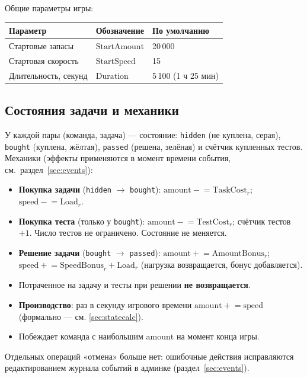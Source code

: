 \documentclass[12pt,a4paper]{article}
\newcommand{\field}[1]{\texttt{#1}}
\begin{document}
Общие параметры игры:

\begin{longtable}{@{}p{5.2cm}p{3.6cm}p{6.4cm}@{}}
\toprule
\textbf{Параметр} & \textbf{Обозначение} & \textbf{По умолчанию} \\
\midrule
Стартовые запасы & $\mathrm{StartAmount}$ & 20\,000 \\
Стартовая скорость & $\mathrm{StartSpeed}$ & 15 \\
Длительность, секунд & $\mathrm{Duration}$ & 5\,100 (1 ч 25 мин) \\
\bottomrule
\end{longtable}

\subsection{Состояния задачи и механики}

У каждой пары (команда, задача) --- состояние: \field{hidden} (не куплена,
серая), \field{bought} (куплена, жёлтая), \field{passed} (решена, зелёная)
и счётчик купленных тестов. Механики (эффекты применяются в момент времени
события, см.~раздел~\ref{sec:events}):

\begin{itemize}[nosep]
  \item \textbf{Покупка задачи} (\field{hidden} $\to$ \field{bought}):
        $\mathrm{amount} \mathrel{-}= \mathrm{TaskCost}_r$;
        $\mathrm{speed} \mathrel{-}= \mathrm{Load}_r$.
  \item \textbf{Покупка теста} (только у \field{bought}):
        $\mathrm{amount} \mathrel{-}= \mathrm{TestCost}_r$; счётчик тестов $+1$.
        Число тестов не ограничено. Состояние не меняется.
  \item \textbf{Решение задачи} (\field{bought} $\to$ \field{passed}):
        $\mathrm{amount} \mathrel{+}= \mathrm{AmountBonus}_r$;
        $\mathrm{speed} \mathrel{+}= \mathrm{SpeedBonus}_r + \mathrm{Load}_r$
        (нагрузка возвращается, бонус добавляется).
  \item Потраченное на задачу и тесты при решении \textbf{не возвращается}.
  \item \textbf{Производство}: раз в секунду игрового времени
        $\mathrm{amount} \mathrel{+}= \mathrm{speed}$ (формально --- см.
        \ref{sec:statecalc}).
  \item Побеждает команда с наибольшим $\mathrm{amount}$ на момент конца игры.
\end{itemize}

Отдельных операций «отмена» больше нет: ошибочные действия исправляются
редактированием журнала событий в админке (раздел~\ref{sec:events}).
\end{document}

